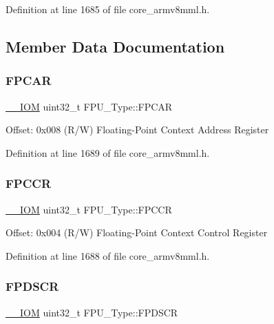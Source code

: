 Definition at line 1685 of file core\+\_\+armv8mml.\+h.



\subsection{Member Data Documentation}
\mbox{\label{struct_f_p_u___type_a55263b468d0f8e11ac77aec9ff87c820}} 
\subsubsection{\texorpdfstring{F\+P\+C\+AR}{FPCAR}}
{\footnotesize\ttfamily \hyperlink{core__sc300_8h_ab6caba5853a60a17e8e04499b52bf691}{\+\_\+\+\_\+\+I\+OM} uint32\+\_\+t F\+P\+U\+\_\+\+Type\+::\+F\+P\+C\+AR}

Offset\+: 0x008 (R/W) Floating-\/\+Point Context Address Register 

Definition at line 1689 of file core\+\_\+armv8mml.\+h.

\mbox{\label{struct_f_p_u___type_af1b708c5e413739150df3d16ca3b7061}} 
\subsubsection{\texorpdfstring{F\+P\+C\+CR}{FPCCR}}
{\footnotesize\ttfamily \hyperlink{core__sc300_8h_ab6caba5853a60a17e8e04499b52bf691}{\+\_\+\+\_\+\+I\+OM} uint32\+\_\+t F\+P\+U\+\_\+\+Type\+::\+F\+P\+C\+CR}

Offset\+: 0x004 (R/W) Floating-\/\+Point Context Control Register 

Definition at line 1688 of file core\+\_\+armv8mml.\+h.

\mbox{\label{struct_f_p_u___type_a58d1989664a06db6ec2e122eefa9f04a}} 
\subsubsection{\texorpdfstring{F\+P\+D\+S\+CR}{FPDSCR}}
{\footnotesize\ttfamily \hyperlink{core__sc300_8h_ab6caba5853a60a17e8e04499b52bf691}{\+\_\+\+\_\+\+I\+OM} uint32\+\_\+t F\+P\+U\+\_\+\+Type\+::\+F\+P\+D\+S\+CR}

